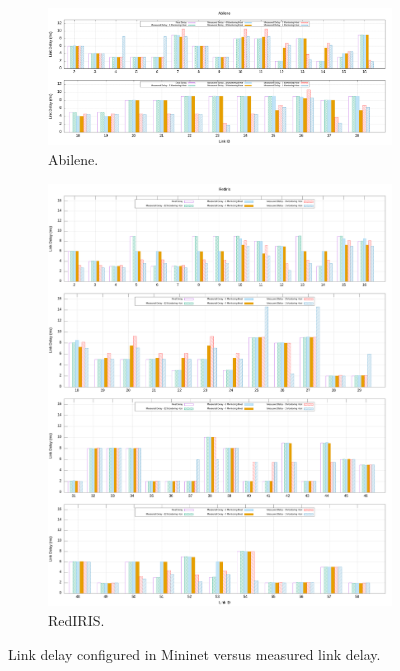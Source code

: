 \documentclass[10pt, journal, letterpaper]{IEEEtran}
\begin{document}
\begin{figure}
    \begin{subfigure}{\columnwidth}
      \centering
      \includegraphics[width=\columnwidth]{img/eval_Abilene_link_delay_real_and_measured.png}
      \caption{Abilene.}
      \label{fig:real_delay_abile}
    \end{subfigure}
    \begin{subfigure}{\columnwidth}
      \centering
      \includegraphics[width=\columnwidth]{img/eval_Rediris_link_delay_real_and_measured.png}
     \caption{RedIRIS.}
     \label{fig:real_delay_rediris}
    \end{subfigure}
    \caption{Link delay configured in Mininet versus measured link delay.}
    \label{fig:real_delay_abile}
\end{figure}
\end{document}
